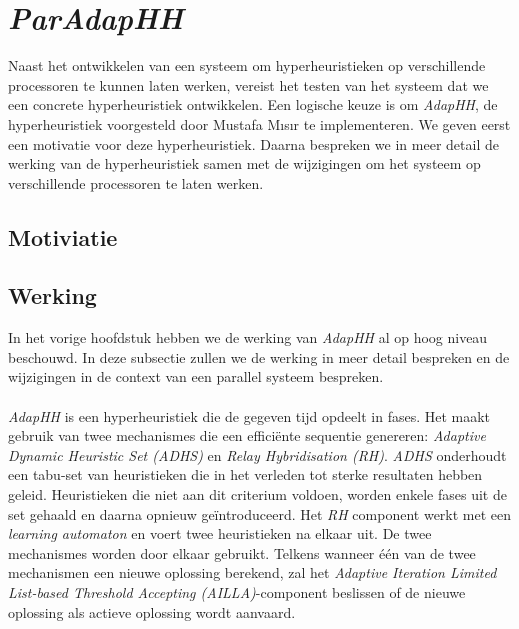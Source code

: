 \section{\emph{ParAdapHH}}

Naast het ontwikkelen van een systeem om hyperheuristieken op verschillende processoren te kunnen laten werken, vereist het testen van het systeem dat we een concrete hyperheuristiek ontwikkelen. Een logische keuze is om \emph{AdapHH}, de hyperheuristiek voorgesteld door Mustafa M\i{}s\i{}r te implementeren. We geven eerst een motivatie voor deze hyperheuristiek. Daarna bespreken we in meer detail de werking van de hyperheuristiek samen met de wijzigingen om het systeem op verschillende processoren te laten werken.

\subsection{Motiviatie}

\subsection{Werking}

In het vorige hoofdstuk hebben we de werking van \emph{AdapHH} al op hoog niveau beschouwd. In deze subsectie zullen we de werking in meer detail bespreken en de wijzigingen in de context van een parallel systeem bespreken.

\paragraph{}
\emph{AdapHH} is een hyperheuristiek die de gegeven tijd opdeelt in fases. Het maakt gebruik van twee mechanismes die een effici\"ente sequentie genereren: \emph{Adaptive Dynamic Heuristic Set (ADHS)} en \emph{Relay Hybridisation (RH)}. \emph{ADHS} onderhoudt een tabu-set van heuristieken die in het verleden tot sterke resultaten hebben geleid. Heuristieken die niet aan dit criterium voldoen, worden enkele fases uit de set gehaald en daarna opnieuw ge\"introduceerd. Het \emph{RH} component werkt met een \emph{learning automaton}\cite{learningAutomaton} en voert twee heuristieken na elkaar uit. De twee mechanismes worden door elkaar gebruikt. Telkens wanneer \'e\'en van de twee mechanismen een nieuwe oplossing berekend, zal het \emph{Adaptive Iteration Limited List-based Threshold Accepting (AILLA)}-component beslissen of de nieuwe oplossing als actieve oplossing wordt aanvaard.

